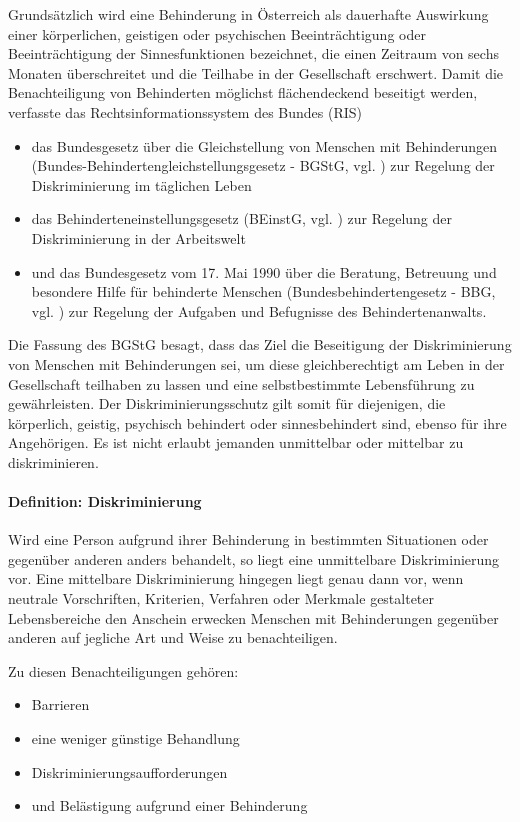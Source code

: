 Grundsätzlich wird eine Behinderung in Österreich als dauerhafte Auswirkung einer körperlichen, geistigen oder psychischen Beeinträchtigung oder Beeinträchtigung
der Sinnesfunktionen bezeichnet, die einen Zeitraum von sechs Monaten überschreitet und die Teilhabe in der Gesellschaft erschwert. Damit die Benachteiligung von 
Behinderten möglichst flächendeckend beseitigt werden, verfasste das Rechtsinformationssystem des Bundes (RIS) 

\begin{itemize}
    \item das Bundesgesetz über die Gleichstellung von Menschen mit Behinderungen (Bundes-Behindertengleichstellungsgesetz - BGStG, vgl. \cite{ris_bgstg_2020}) 
    zur Regelung der Diskriminierung im täglichen Leben
    \item das Behinderteneinstellungsgesetz (BEinstG, vgl. \cite{ris_beinstg_2020}) zur Regelung der Diskriminierung in der Arbeitswelt
    \item und das Bundesgesetz vom 17. Mai 1990 über die Beratung, Betreuung und besondere Hilfe für behinderte Menschen (Bundesbehindertengesetz - BBG, vgl. \cite{ris_bbg_2020}) 
    zur Regelung der Aufgaben und Befugnisse des Behindertenanwalts.
\end{itemize}

Die Fassung des BGStG besagt, dass das Ziel die Beseitigung der Diskriminierung von Menschen mit Behinderungen sei, um diese 
gleichberechtigt am Leben in der Gesellschaft teilhaben zu lassen und eine selbstbestimmte Lebensführung zu gewährleisten.
Der Diskriminierungsschutz gilt somit für diejenigen, die körperlich, geistig, psychisch behindert oder sinnesbehindert sind, 
ebenso für ihre Angehörigen. Es ist nicht erlaubt jemanden unmittelbar oder mittelbar zu diskriminieren.

\paragraph{Definition: Diskriminierung}
Wird eine Person aufgrund ihrer Behinderung in bestimmten Situationen oder gegenüber anderen anders behandelt, so liegt eine unmittelbare Diskriminierung vor.
Eine mittelbare Diskriminierung hingegen liegt genau dann vor, wenn neutrale Vorschriften, Kriterien, Verfahren oder Merkmale gestalteter Lebensbereiche 
den Anschein erwecken Menschen mit Behinderungen gegenüber anderen auf jegliche Art und Weise zu benachteiligen.

Zu diesen Benachteiligungen gehören: 
\begin{itemize}
    \item Barrieren
    \item eine weniger günstige Behandlung
    \item Diskriminierungsaufforderungen
    \item und Belästigung aufgrund einer Behinderung
\end{itemize}

